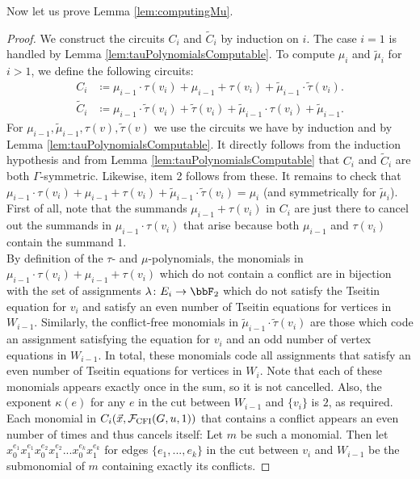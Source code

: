 \documentclass[10pt,a4paper]{article}
\newcommand{\Ff}{{\cal F}}
\newcommand{\CFI}{\Ff_{\mathrm{CFI}}}
\newcommand{\tautilde}{\tilde{\tau}}
\newcommand{\mutilde}{\tilde{\mu}}
\begin{document}
Now let us prove Lemma \ref{lem:computingMu}.
\begin{proof}
	We construct the circuits $C_i$ and 
	$\widetilde{C}_i$ by induction on $i$.
	The case $i = 1$ is handled by Lemma \ref{lem:tauPolynomialsComputable}.
	To compute $\mu_i$ and $\mutilde_i$ for $i > 1$, we define the following circuits:
	\begin{align*}
		C_i &\coloneqq \mu_{i-1} \cdot \tau(v_i) + \mu_{i-1} + \tau(v_i)  + \mutilde_{i-1} \cdot \tautilde(v_i).\\
		\widetilde{C}_i &\coloneqq \mu_{i-1} \cdot \tautilde(v_i) +  \tautilde(v_i) + \mutilde_{i-1} \cdot \tau(v_i) + \mutilde_{i-1}.
	\end{align*}	
	For $\mu_{i-1}, \mutilde_{i-1}, \tau(v), \tautilde(v)$ we use the circuits we have by induction and by Lemma \ref{lem:tauPolynomialsComputable}.
	It directly follows from the induction hypothesis and from Lemma \ref{lem:tauPolynomialsComputable} that $C_i$ and $\widetilde{C}_i$ are both $\Gamma$-symmetric. Likewise, item 2 follows from these. It remains to check that $\mu_{i-1} \cdot \tau(v_i) + \mu_{i-1} + \tau(v_i) + \mutilde_{i-1} \cdot \tautilde(v_i) = \mu_i$ (and symmetrically for $\mutilde_i$). First of all, note that the summands $\mu_{i-1} + \tau(v_i)$ in $C_i$ are just there to cancel out the summands in $\mu_{i-1} \cdot \tau(v_i)$ that arise because both $\mu_{i-1}$ and $\tau(v_i)$ contain the summand $1$.\\
	By definition of the $\tau$- and $\mu$-polynomials, the monomials in $\mu_{i-1} \cdot \tau(v_i) + \mu_{i-1} + \tau(v_i)$ which do not contain a conflict are in bijection with the set of assignments $\lambda\colon E_i \to \bbF_2$ which do not satisfy the Tseitin equation for $v_i$ and satisfy an even number of Tseitin equations for vertices in $W_{i-1}$. Similarly, the conflict-free monomials in $\mutilde_{i-1} \cdot \tautilde(v_i)$ are those which code an assignment satisfying the equation for $v_i$ and an odd number of vertex equations in $W_{i-1}$. In total, these monomials code all assignments that satisfy an even number of Tseitin  equations for vertices in $W_i$. Note that each of these monomials appears exactly once in the sum, so it is not cancelled. Also, the exponent $\kappa(e)$ for any $e$ in the cut between $W_{i-1}$ and $\{v_i\}$ is $2$, as required. Each monomial in $C_i(\vec x, \CFI(G, u, 1))$ that contains a conflict appears an even number of times and thus cancels itself: Let $m$ be such a monomial. Then let $x_0^{e_1}x_1^{e_1}x_0^{e_2}x_1^{e_2}...x_0^{e_k}x_1^{e_k}$ for edges $\{e_1,...,e_k\}$ in the cut between $v_i$ and $W_{i-1}$ be the submonomial of $m$ containing exactly its conflicts.

\end{proof}
\end{document}
